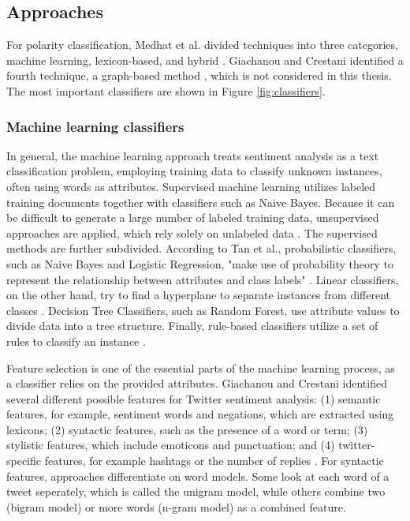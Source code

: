 \subsection{Approaches}
For polarity classification, Medhat et al. divided techniques into three categories, machine learning, lexicon-based, and hybrid \cite{MEDHAT20141093}. Giachanou and Crestani identified a fourth technique, a graph-based method \cite{DBLP:journals/csur/GiachanouC16}, which is not considered in this thesis. The most important classifiers are shown in Figure \ref{fig:classifiers}. 

\subsubsection{Machine learning classifiers}
\label{sub:fund_mach}
In general, the machine learning approach treats sentiment analysis as a text classification problem, employing training data to classify unknown instances, often using words as attributes. Supervised machine learning utilizes labeled training documents together with classifiers such as Naive Bayes. Because it can be difficult to generate a large number of labeled training data, unsupervised approaches are applied, which rely solely on unlabeled data \cite{MEDHAT20141093}. The supervised methods are further subdivided. According to Tan et al., probabilistic classifiers, such as Naive Bayes and Logistic Regression, "make use of probability theory to represent the relationship between attributes and class labels" \cite[p.~414]{DBLP:books/aw/TanSKK2019}. Linear classifiers, on the other hand, try to find a hyperplane to separate instances from different classes \cite{MEDHAT20141093}. Decision Tree Classifiers, such as Random Forest, use attribute values to divide data into a tree structure. Finally, rule-based classifiers utilize a set of rules to classify an instance \cite{DBLP:books/aw/TanSKK2019}.

Feature selection is one of the essential parts of the machine learning process, as a classifier relies on the provided attributes. Giachanou and Crestani identified several different possible features for Twitter sentiment analysis: (1) semantic features, for example, sentiment words and negations, which are extracted using lexicons; (2) syntactic features, such as the presence of a word or term; (3) stylistic features, which include emoticons and punctuation; and (4) twitter-specific features, for example hashtags or the number of replies \cite{DBLP:journals/csur/GiachanouC16}. For syntactic features, approaches differentiate on word models. Some look at each word of a tweet seperately, which is called the unigram model, while others combine two (bigram model) or more words (n-gram model) as a combined feature.

